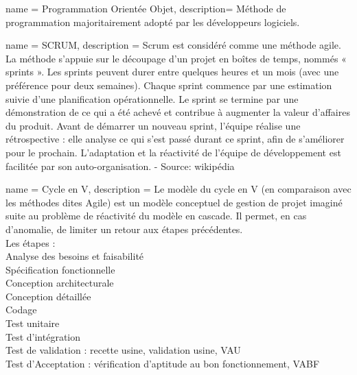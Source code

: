 
                 {
                   name = {Programmation Orientée Objet},
                   description= {Méthode de programmation majoritairement adopté par les développeurs logiciels.}
                 }

{
name = {SCRUM},
description = {Scrum est considéré comme une méthode agile.\\ La méthode s'appuie sur le découpage d'un projet en boîtes de temps, nommés « sprints ». Les sprints peuvent durer entre quelques heures et un mois (avec une préférence pour deux semaines). Chaque sprint commence par une estimation suivie d'une planification opérationnelle. Le sprint se termine par une démonstration de ce qui a été achevé et contribue à augmenter la valeur d'affaires du produit. Avant de démarrer un nouveau sprint, l'équipe réalise une rétrospective : elle analyse ce qui s'est passé durant ce sprint, afin de s'améliorer pour le prochain. L'adaptation et la réactivité de l'équipe de développement est facilitée par son auto-organisation. - Source: wikipédia }
}

{
name = {Cycle en V},
description = {
Le modèle du cycle en V (en comparaison avec les méthodes dites Agile) est un modèle conceptuel de gestion de projet imaginé suite au problème de réactivité du modèle en cascade. Il permet, en cas d'anomalie, de limiter un retour aux étapes précédentes. \\
Les étapes : \\
    Analyse des besoins et faisabilité \\
    Spécification fonctionnelle \\
    Conception architecturale\\
    Conception détaillée\\
    Codage\\
    Test unitaire \\
    Test d'intégration\\
    Test de validation : recette usine, validation usine, VAU\\
    Test d'Acceptation : vérification d'aptitude au bon fonctionnement, VABF\\}
}

